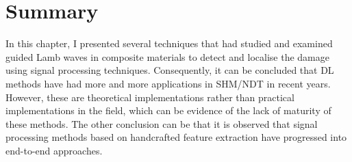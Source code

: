 \section{Summary}
\label{sec34}
In this chapter, I presented several techniques that had studied and examined guided Lamb waves in composite materials to detect and localise the damage using signal processing techniques. 
Consequently, it can be concluded that DL methods have had more and more applications in SHM/NDT in recent years. 
However, these are theoretical implementations rather than practical implementations in the field, which can be evidence of the lack of maturity of these methods. 
The other conclusion can be that it is observed that signal processing methods based on handcrafted feature extraction have progressed into end-to-end approaches.
 
%
%
